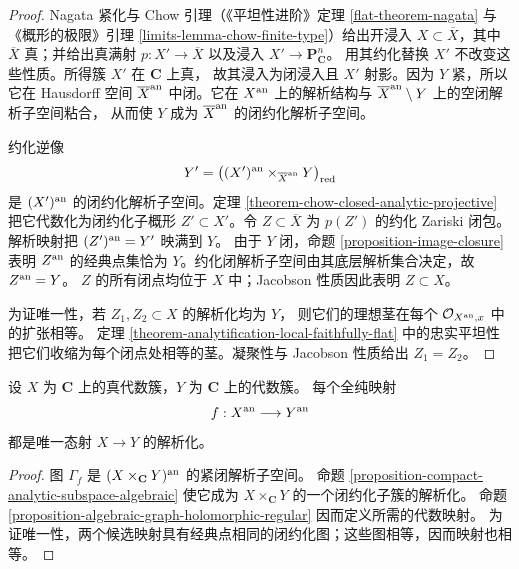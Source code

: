 \begin{proof}
Nagata 紧化与 Chow 引理（《平坦性进阶》定理
\ref{flat-theorem-nagata} 与《概形的极限》引理
\ref{limits-lemma-chow-finite-type}）给出开浸入
$X\subset\overline X$，其中 $\overline X$ 真；并给出真满射
$p:X'\to\overline X$ 以及浸入 $X'\to\mathbf P^n_{\mathbf C}$。
用其约化替换 $X'$ 不改变这些性质。所得簇 $X'$ 在 $\mathbf C$ 上真，
故其浸入为闭浸入且 $X'$ 射影。因为 $Y$ 紧，所以它在 Hausdorff 空间
$\overline X^{\rm an}$ 中闭。它在 $X^{\rm an}$ 上的解析结构与
$\overline X^{\rm an}\setminus Y$ 上的空闭解析子空间粘合，
从而使 $Y$ 成为 $\overline X^{\rm an}$ 的闭约化解析子空间。

约化逆像
$$
Y'=\left((X')^{\rm an}\times_{\overline X^{\rm an}}Y\right)_{\rm red}
$$
是 $(X')^{\rm an}$ 的闭约化解析子空间。定理
\ref{theorem-chow-closed-analytic-projective} 把它代数化为闭约化子概形
$Z'\subset X'$。令 $Z\subset\overline X$ 为 $p(Z')$
的约化 Zariski 闭包。解析映射把 $(Z')^{\rm an}=Y'$ 映满到 $Y$。
由于 $Y$ 闭，命题 \ref{proposition-image-closure} 表明 $Z^{\rm an}$
的经典点集恰为 $Y$。约化闭解析子空间由其底层解析集合决定，故 $Z^{\rm an}=Y$。
$Z$ 的所有闭点均位于 $X$ 中；Jacobson 性质因此表明 $Z\subset X$。

为证唯一性，若 $Z_1,Z_2\subset X$ 的解析化均为 $Y$，
则它们的理想茎在每个 $\mathcal O_{X^{\rm an},x}$ 中的扩张相等。
定理 \ref{theorem-analytification-local-faithfully-flat} 中的忠实平坦性
把它们收缩为每个闭点处相等的茎。凝聚性与 Jacobson 性质给出 $Z_1=Z_2$。
\end{proof}

\begin{proposition}
\label{proposition-holomorphic-map-from-proper-is-regular}
\begin{reference}
\cite[\S 4，第 19 号，命题 15]{GAGA}
\end{reference}
设 $X$ 为 $\mathbf C$ 上的真代数簇，$Y$ 为 $\mathbf C$ 上的代数簇。
每个全纯映射
$$
f:X^{\rm an}\longrightarrow Y^{\rm an}
$$
都是唯一态射 $X\to Y$ 的解析化。
\end{proposition}

\begin{proof}
图 $\Gamma_f$ 是 $(X\times_{\mathbf C}Y)^{\rm an}$ 的紧闭解析子空间。
命题 \ref{proposition-compact-analytic-subspace-algebraic}
使它成为 $X\times_{\mathbf C}Y$ 的一个闭约化子簇的解析化。
命题 \ref{proposition-algebraic-graph-holomorphic-regular} 因而定义所需的代数映射。
为证唯一性，两个候选映射具有经典点相同的闭约化图；这些图相等，因而映射也相等。
\end{proof}

